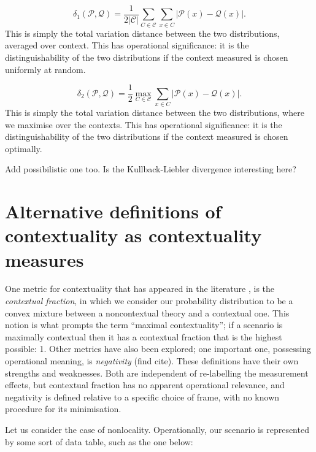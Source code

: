 \documentclass{amsart}
\theoremstyle{definition}
\begin{document}
\begin{equation}
\delta_1(\mathcal{P},\mathcal{Q})=\frac{1}{2\left|\mathcal{C}\right|}\sum_{C\in\mathcal{C}}\sum_{x\in C}\left|\mathcal{P}(x)-\mathcal{Q}(x)\right|.
\end{equation}
 This is simply the total variation distance between the two distributions, averaged over context. This has operational significance: it is the distinguishability of the two distributions if the context measured is chosen uniformly at random.


\begin{equation}
\delta_2(\mathcal{P},\mathcal{Q})=\frac{1}{2}\max_{C\in\mathcal{C}}\sum_{x\in C}\left|\mathcal{P}(x)-\mathcal{Q}(x)\right|.
\end{equation}
 This is simply the total variation distance between the two distributions, where we maximise over the contexts. This has operational significance: it is the distinguishability of the two distributions if the context measured is chosen optimally.

Add possibilistic one too. Is the Kullback-Liebler divergence interesting here?

\section{Alternative definitions of contextuality as contextuality measures}

One metric for contextuality that has appeared in the literature \cite{Abra2011, DeSi2015}, is the \emph{contextual fraction}, in which we consider our probability distribution to be a convex mixture between a noncontextual theory and a contextual one. This notion is what prompts the term ``maximal contextuality''; if a scenario is maximally contextual then it has a contextual fraction that is the highest possible: 1. Other metrics have also been explored; one important one, possessing operational meaning, is \emph{negativity} (find cite). These definitions have their own strengths and weaknesses. Both are independent of re-labelling the measurement effects, but contextual fraction has no apparent operational relevance, and negativity is defined relative to a specific choice of frame, with no known procedure for its minimisation.

Let us consider the case of nonlocality. Operationally, our scenario is represented by some sort of data table, such as the one below:
\end{document}
